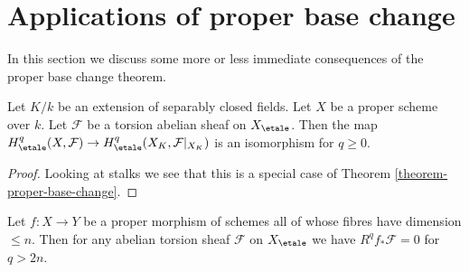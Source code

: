\section{Applications of proper base change}
\label{section-applications-proper-base-change}

\noindent
In this section we discuss some more or less immediate
consequences of the proper base change theorem.

\begin{lemma}
\label{lemma-base-change-separably-closed}
Let $K/k$ be an extension of separably closed fields.
Let $X$ be a proper scheme over $k$.
Let $\mathcal{F}$ be a torsion abelian sheaf on $X_\etale$.
Then the map $H^q_\etale(X, \mathcal{F}) \to
H^q_\etale(X_K, \mathcal{F}|_{X_K})$ is an isomorphism
for $q \geq 0$.
\end{lemma}

\begin{proof}
Looking at stalks we see that
this is a special case of
Theorem \ref{theorem-proper-base-change}.
\end{proof}

\begin{lemma}
\label{lemma-cohomological-dimension-proper}
Let $f : X \to Y$ be a proper morphism of schemes
all of whose fibres have dimension $\leq n$.
Then for any abelian torsion sheaf $\mathcal{F}$ on $X_\etale$
we have $R^qf_*\mathcal{F} = 0$ for $q > 2n$.
\end{lemma}

